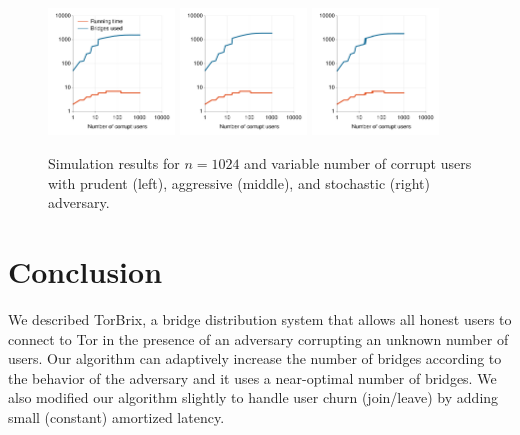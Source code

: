\documentclass[letterpaper,twocolumn,10pt]{article}
\newcommand{\sfsize}{\fontsize{0.73\baselineskip}{0.73\baselineskip}\selectfont}
\newcommand{\sans}[1]{\textsf{\sfsize \mbox{#1}}}
\newcommand{\brix}{\sans{TorBrix}\xspace}
\begin{document}
\begin{figure}
	\hspace{-0.4em}
	\includegraphics[width=0.3\textwidth]{images/plot-prudent-VarT-1024}	
	\hspace{0.3em}
	\includegraphics[width=0.3\textwidth]{images/plot-aggressive-VarT-1024}	
	\hspace{0.3em}
	\includegraphics[width=0.3\textwidth]{images/plot-stochastic-VarT-1024}
	\caption{Simulation results for ${n=1024}$ and variable number of corrupt users with prudent (left), aggressive (middle), and stochastic (right) adversary.}
	\label{fig:plot2} 
\end{figure}

\section{Conclusion} \label{sec:conclusion}
We described \brix, a bridge distribution system that allows all honest users to connect to Tor in the presence of an adversary corrupting an unknown number of users. Our algorithm can adaptively increase the number of bridges according to the behavior of the adversary and it uses a near-optimal number of bridges. We also modified our algorithm slightly to handle user churn (join/leave) by adding small (constant) amortized latency.
\end{document}
